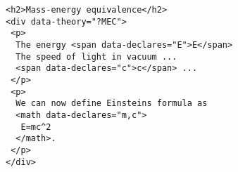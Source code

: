 \begin{lstlisting}
<h2>Mass-energy equivalence</h2>
<div data-theory="?MEC">
 <p>
  The energy <span data-declares="E">E</span>
  The speed of light in vacuum ... 
  <span data-declares="c">c</span> ...
 </p>
 <p>
  We can now define Einsteins formula as 
  <math data-declares="m,c">
   E=mc^2
  </math>. 
 </p>
</div>
\end{lstlisting}